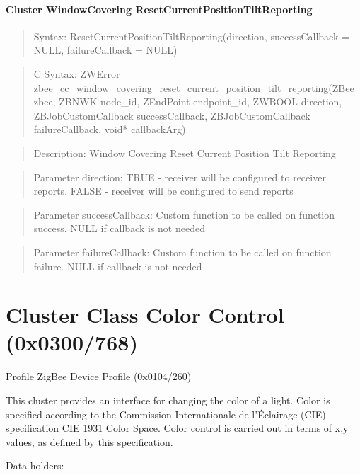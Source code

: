 \paragraph{Cluster WindowCovering ResetCurrentPositionTiltReporting}
\begin{quote}Syntax: ResetCurrentPositionTiltReporting(direction, successCallback = NULL, failureCallback = NULL)\end{quote}
\begin{quote}C Syntax: ZWError zbee\_cc\_window\_covering\_reset\_current\_position\_tilt\_reporting(ZBee zbee, ZBNWK node\_id, ZEndPoint endpoint\_id, ZWBOOL direction, ZBJobCustomCallback successCallback, ZBJobCustomCallback failureCallback, void* callbackArg)\end{quote}
\begin{quote}Description: Window Covering Reset Current Position Tilt Reporting\end{quote}
\begin{quote}Parameter direction: TRUE  - receiver will be configured to receiver reports. FALSE - receiver will be configured to send reports\end{quote}
\begin{quote}Parameter successCallback: Custom function to be called on function success. NULL if callback is not needed\end{quote}
\begin{quote}Parameter failureCallback: Custom function to be called on function failure. NULL if callback is not needed\end{quote}



\section{Cluster Class Color Control (0x0300/768)}

Profile ZigBee Device Profile (0x0104/260)

This cluster provides an interface for changing the color of a light. Color is specified according to the Commission Internationale de l'Éclairage (CIE) specification CIE 1931 Color Space. Color control is carried out in terms of x,y values, as defined by this specification.
\newline

\noindent
Data holders:

